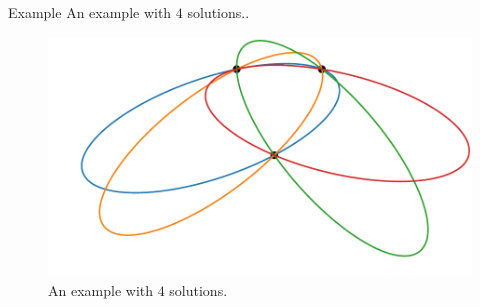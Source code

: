 \documentclass{beamer}
\begin{document}
\begin{frame}{Example}
	An example with $4$ solutions.\cite{andreta}.
	\begin{figure}
		\centering
		
		\includegraphics[scale=.6]{e3psol012}
		\caption{An example with $4$ solutions.}
	\end{figure}
\end{frame}

	
\end{document}
